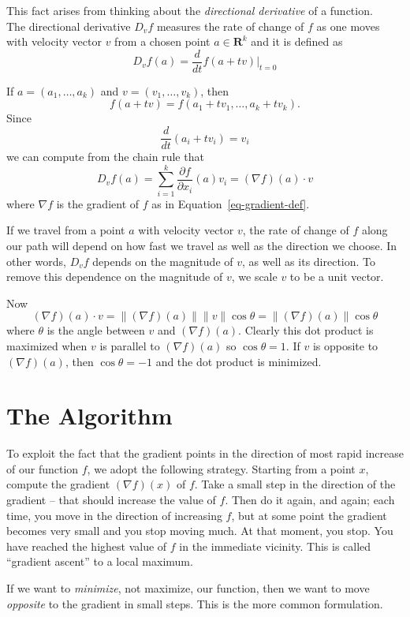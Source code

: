 \documentclass[
  11pt,
  letterpaper,
]{scrbook}
\theoremstyle{plain}
\theoremstyle{remark}
\begin{document}
This fact arises from thinking about the \emph{directional derivative}
of a function.\\
The directional derivative \(D_{v}f\) measures the rate of change of
\(f\) as one moves with velocity vector \(v\) from a chosen point
\(a\in\mathbf{R}^{k}\) and it is defined as \[
D_{v}f(a) = \frac{d}{dt}f(a+tv)|_{t=0}
\]

If \(a=(a_1,\ldots, a_{k})\) and \(v=(v_{1},\ldots, v_{k})\), then \[
f(a+tv) = f(a_{1}+tv_{1},\ldots, a_{k}+tv_{k}).
\] Since \[
\frac{d}{dt}(a_{i}+tv_{i})=v_{i}
\] we can compute from the chain rule that \[
D_{v}f(a) = \sum_{i=1}^{k} \frac{\partial f}{\partial x_{i}}(a)v_{i} = (\nabla f)(a)\cdot v
\] where \(\nabla f\) is the gradient of \(f\) as in
Equation~\ref{eq-gradient-def}.

If we travel from a point \(a\) with velocity vector \(v\), the rate of
change of \(f\) along our path will depend on how fast we travel as well
as the direction we choose. In other words, \(D_{v}f\) depends on the
magnitude of \(v\), as well as its direction. To remove this dependence
on the magnitude of \(v\), we scale \(v\) to be a unit vector.

Now \[
(\nabla f)(a)\cdot v=\|(\nabla f)(a)\|\|v\|\cos\theta=\|(\nabla f)(a)\|\cos \theta
\] where \(\theta\) is the angle between \(v\) and \((\nabla f)(a)\).
Clearly this dot product is maximized when \(v\) is parallel to
\((\nabla f)(a)\) so \(\cos\theta=1\). If \(v\) is opposite to
\((\nabla f)(a)\), then \(\cos\theta=-1\) and the dot product is
minimized.

\hypertarget{the-algorithm}{%
\section{The Algorithm}\label{the-algorithm}}

To exploit the fact that the gradient points in the direction of most
rapid increase of our function \(f\), we adopt the following strategy.
Starting from a point \(x\), compute the gradient \((\nabla f)(x)\) of
\(f\). Take a small step in the direction of the gradient -- that should
increase the value of \(f\). Then do it again, and again; each time, you
move in the direction of increasing \(f\), but at some point the
gradient becomes very small and you stop moving much. At that moment,
you stop. You have reached the highest value of \(f\) in the immediate
vicinity. This is called ``gradient ascent'' to a local maximum.

If we want to \emph{minimize}, not maximize, our function, then we want
to move \emph{opposite} to the gradient in small steps. This is the more
common formulation.
\end{document}
